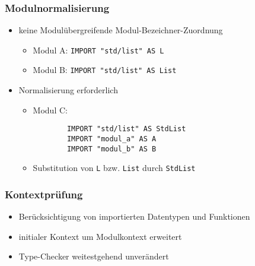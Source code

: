 \begin{frame}[containsverbatim=true]
\frametitle{Modulnormalisierung}

\begin{itemize}
\item keine Modulübergreifende Modul-Bezeichner-Zuordnung
	\begin{itemize}
	\item Modul A: \verb+IMPORT "std/list" AS L+
	\item Modul B: \verb+IMPORT "std/list" AS List+
	\end{itemize}
\item Normalisierung erforderlich
	\begin{itemize}
	\item Modul C:
		\begin{verbatim}
		IMPORT "std/list" AS StdList
		IMPORT "modul_a" AS A
		IMPORT "modul_b" AS B
		\end{verbatim}
	\item Substitution von \verb+L+ bzw. \verb+List+ durch \verb+StdList+
	\end{itemize}
\end{itemize}

\end{frame}


\begin{frame}
\frametitle{Kontextprüfung}

\begin{itemize}
\item Berücksichtigung von importierten Datentypen und Funktionen
\item initialer Kontext um Modulkontext erweitert
\item Type-Checker weitestgehend unverändert
\end{itemize}

\end{frame}
